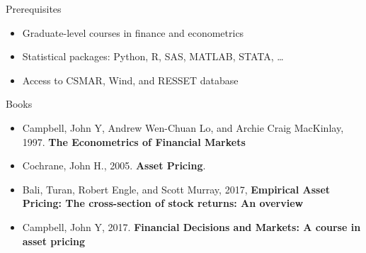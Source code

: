 \documentclass{beamer}
\begin{document}
\begin{frame}{Prerequisites}
	\begin{itemize}
		\item Graduate-level courses in finance and econometrics
		\item Statistical packages: \alert{Python}, \alert{R}, SAS, MATLAB, STATA, …
		\item Access to CSMAR, Wind, and RESSET database
	\end{itemize}
\end{frame}

\begin{frame}{Books}
	\begin{itemize}
		\item Campbell, John Y, Andrew Wen-Chuan Lo, and Archie Craig MacKinlay, 1997. \alert{\textbf{The Econometrics of Financial Markets}}
		\item Cochrane, John H., 2005.\alert{ \textbf{Asset Pricing}}.
		\item Bali, Turan, Robert Engle, and Scott Murray, 2017, \alert{\textbf{Empirical Asset Pricing: The cross-section of stock returns: An overview}}
		\item Campbell, John Y, 2017. \alert{\textbf{Financial Decisions and Markets: A course in asset pricing}}
	\end{itemize}
\end{frame}
\end{document}
